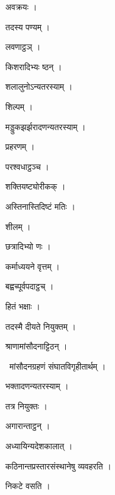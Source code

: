 \documentclass[10pt, openany, oneside]{book}
\begin{document}
\noindent अवक्रयः ।

\noindent तदस्य पण्यम् ।

\noindent लवणाट्ठञ् ।

\noindent किशरादिभ्यः ष्ठन् ।

\noindent शलालुनोऽन्यतरस्याम् ।

\noindent शिल्पम् ।

\noindent मड्डुकझर्झरादणन्यतरस्याम् ।

\noindent प्रहरणम् ।

\noindent परश्वधाट्ठञ्च ।

\noindent शक्तियष्ट्योरीकक् ।

\noindent अस्तिनास्तिदिष्टं मतिः ।

\noindent शीलम् ।

\noindent छत्रादिभ्यो णः ।

\noindent कर्माध्ययने वृत्तम् ।

\noindent बह्वच्पूर्वपदाट्ठच् ।

\noindent हितं भक्षाः ।

\noindent तदस्मै दीयते नियुक्तम् ।

\noindent श्राणामांसौदनाट्टिठन् ।

\par\noindent\hspace{1.5em}{\vps वा॰}~{\qt मांसौदनग्रहणं संघातविगृहीतार्थम् ।}

\noindent भक्तादणन्यतरस्याम् ।

\noindent तत्र नियुक्तः ।

\noindent अगारान्ताट्ठन् ।

\noindent अध्यायिन्यदेशकालात् ।

\noindent कठिनान्तप्रस्तारसंस्थानेषु व्यवहरति ।

\noindent निकटे वसति ।
\end{document}
